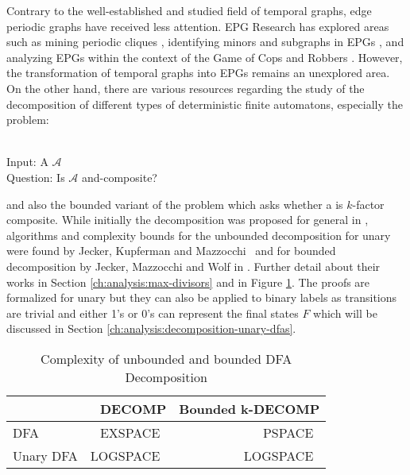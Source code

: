 Contrary to the well-established and studied field of temporal graphs, edge periodic graphs have received less attention.
EPG Research has explored areas such as mining periodic cliques \cite{clique-mining-epg}, identifying minors and subgraphs in EPGs \cite{minor-subgraph-epg}, and analyzing EPGs within the context of the Game of Cops and Robbers \cite{erlebach2020game}.
However, the transformation of temporal graphs into EPGs remains an unexplored area.
On the other hand, there are various resources regarding the study of the decomposition of different types of deterministic finite automatons, especially the problem:
\begin{defn}{\ \\}
	Input: A \DFA $\mathcal{A}$\\
	Question: Is $\mathcal{A}$ and-composite?
\end{defn}
and also the bounded variant of the problem which asks whether a \DFA is $k$-factor composite. While initially the decomposition was proposed for general \DFAs in \cite{prime-languages}, algorithms and complexity bounds for the unbounded decomposition for unary \DFAs were found by Jecker, Kupferman and Mazzocchi~\cite{unara-prime-languages} and for bounded decomposition by Jecker, Mazzocchi and Wolf in \cite{DBLP:journals/corr/abs-2107-04683}.
Further detail about their works in Section \ref{ch:analysis:max-divisors} and in Figure \ref{tab:dfa-decomp-complexity}.
The proofs are formalized for unary \DFAs but they can also be applied to binary labels as transitions are trivial and either 1's or 0's can represent the final states $F$ which will be discussed in Section \ref{ch:analysis:decomposition-unary-dfas}.
\begin{table}[h]
	\centering
	\begin{tabular}{l|rr}
		&  DECOMP & Bounded k-DECOMP  \\
		\hline
		DFA & EXSPACE~\cite{prime-languages} & PSPACE~\cite{DBLP:journals/corr/abs-2107-04683}  \\
		Unary DFA & LOGSPACE~\cite{unara-prime-languages} &  LOGSPACE~\cite{DBLP:journals/corr/abs-2107-04683}
	\end{tabular}
	\caption{Complexity of unbounded and bounded DFA Decomposition}
	\label{tab:dfa-decomp-complexity}
\end{table}


